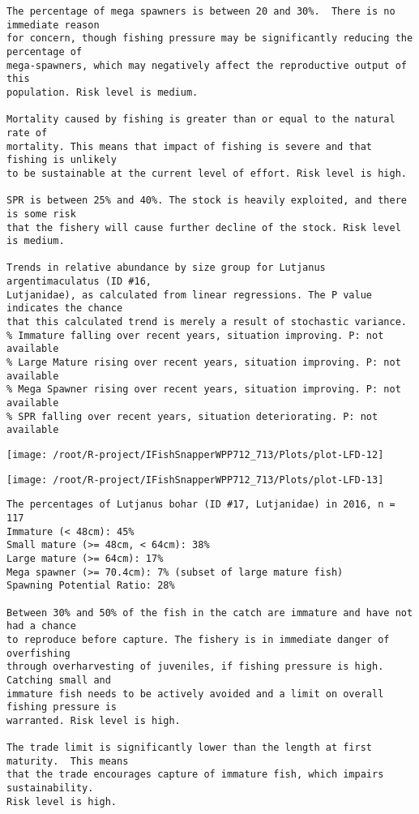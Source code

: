 \documentclass{report}\usepackage[]{graphicx}\usepackage[]{color}
\makeatletter
\def\maxwidth{ %
  \ifdim\Gin@nat@width>\linewidth
    \linewidth
  \else
    \Gin@nat@width
  \fi
}
\newenvironment{kframe}{%
 \def\at@end@of@kframe{}%
 \ifinner\ifhmode%
  \def\at@end@of@kframe{\end{minipage}}%
  \begin{minipage}{\columnwidth}%
 \fi\fi%
 \def\FrameCommand##1{\hskip\@totalleftmargin \hskip-\fboxsep
 \colorbox{shadecolor}{##1}\hskip-\fboxsep
     \hskip-\linewidth \hskip-\@totalleftmargin \hskip\columnwidth}%
 \MakeFramed {\advance\hsize-\width
   \@totalleftmargin\z@ \linewidth\hsize
   \@setminipage}}%
 {\par\unskip\endMakeFramed%
 \at@end@of@kframe}
\newenvironment{knitrout}{}{} %
\makeatother
\begin{document}
\begin{knitrout}
\begin{kframe}
\begin{verbatim}
The percentage of mega spawners is between 20 and 30%.  There is no immediate reason
for concern, though fishing pressure may be significantly reducing the percentage of
mega-spawners, which may negatively affect the reproductive output of this
population. Risk level is medium.
 
Mortality caused by fishing is greater than or equal to the natural rate of
mortality. This means that impact of fishing is severe and that fishing is unlikely
to be sustainable at the current level of effort. Risk level is high.
 
SPR is between 25% and 40%. The stock is heavily exploited, and there is some risk
that the fishery will cause further decline of the stock. Risk level is medium.
 
Trends in relative abundance by size group for Lutjanus argentimaculatus (ID #16,
Lutjanidae), as calculated from linear regressions. The P value indicates the chance
that this calculated trend is merely a result of stochastic variance.
% Immature falling over recent years, situation improving. P: not available
% Large Mature rising over recent years, situation improving. P: not available
% Mega Spawner rising over recent years, situation improving. P: not available
% SPR falling over recent years, situation deteriorating. P: not available
\end{verbatim}
\end{kframe}
\texttt{[image: /root/R-project/IFishSnapperWPP712\_713/Plots/plot-LFD-12]} 

\texttt{[image: /root/R-project/IFishSnapperWPP712\_713/Plots/plot-LFD-13]} 
\begin{kframe}\begin{verbatim}
The percentages of Lutjanus bohar (ID #17, Lutjanidae) in 2016, n = 117
Immature (< 48cm): 45%
Small mature (>= 48cm, < 64cm): 38%
Large mature (>= 64cm): 17%
Mega spawner (>= 70.4cm): 7% (subset of large mature fish)
Spawning Potential Ratio: 28%
 
Between 30% and 50% of the fish in the catch are immature and have not had a chance
to reproduce before capture. The fishery is in immediate danger of overfishing
through overharvesting of juveniles, if fishing pressure is high.  Catching small and
immature fish needs to be actively avoided and a limit on overall fishing pressure is
warranted. Risk level is high.

The trade limit is significantly lower than the length at first maturity.  This means
that the trade encourages capture of immature fish, which impairs sustainability.
Risk level is high.


\end{verbatim}
\end{kframe}
\end{knitrout}
\end{document}
